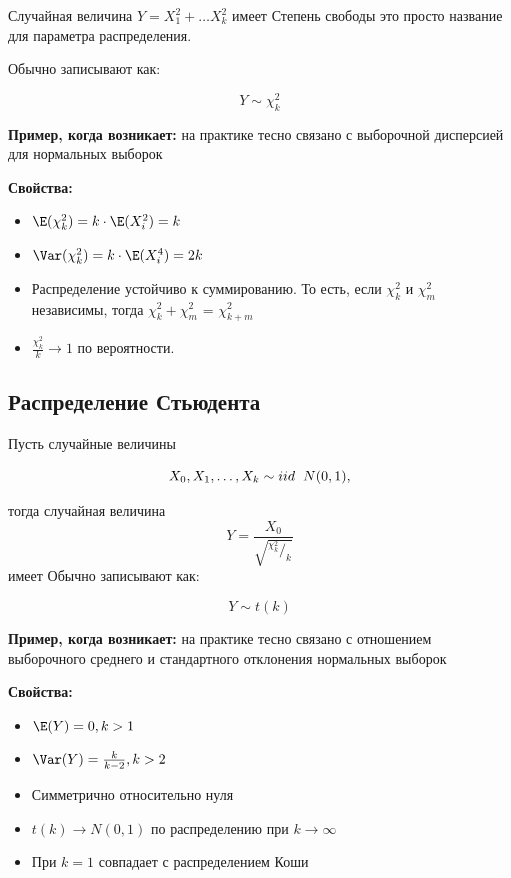 \documentclass[12pt, a4paper, oneside]{article}
\begin{document}
Случайная величина $Y = X_1^2 + \ldots X_k^2$ имеет   Степень свободы это просто название для параметра распределения.

Обычно записывают как:

$$
Y \sim \chi^2_k
$$   

\textbf{Пример, когда возникает:} на практике тесно связано с выборочной дисперсией для нормальных выборок

\textbf{Свойства:}

\begin{itemize} 
\item $\E(\chi^2_k) = k \cdot \E(X_i^2) = k$
\item $\Var(\chi^2_k) = k \cdot \E(X_i^4) = 2k$
\item Распределение устойчиво к суммированию. То есть, если $\chi^2_k$ и $\chi^2_m$ независимы, тогда $\chi^2_k + \chi^2_m$ = $\chi^2_{k+m}$
\item $\frac{\chi^2_k}{k} \to 1$ по вероятности. 
\end{itemize} 


\subsection*{Распределение Стьюдента}

Пусть случайные величины

$$
X_0, X_1, \ldots, X_k \sim iid \hspace{2mm} N(0,1),
$$ 

тогда случайная величина $$ Y = \frac{X_0}{\sqrt{^{\chi^2_k}/_k}} $$ имеет   
Обычно записывают как:

$$
Y \sim t(k)
$$   

\textbf{Пример, когда возникает:} на практике тесно связано с отношением выборочного среднего и стандартного отклонения нормальных выборок

\textbf{Свойства:}

\begin{itemize} 
\item $\E(Y) = 0, k > 1$
\item $\Var(Y) = \frac{k}{k-2}, k > 2$
\item Симметрично относительно нуля
\item $t(k) \to N(0,1)$ по распределению при $k \to \infty$
\item При $k=1$ совпадает с распределением Коши
\end{itemize} 
\end{document}

